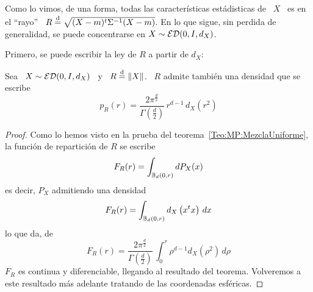Como lo vimos, de una forma, todas las caracter\'isticas est\'adisticas de \ $X$
\ es  en el ``rayo''  \ $R \stackrel{\mathrm{d}}{=}  \sqrt{(X-m)^t \Sigma^{-1} (X-m)}$. En  lo que
sigue,  sin   perdida  de  generalidad,   se  puede  concentrarse  en   $X  \sim
\mathcal{ED}(0,I,d_X)$.

Primero, se puede escribir la ley de $R$ a partir de $d_X$:
%
\begin{teorema}\label{Teo:MP:DensidadRayo}
  Sea \ $X \sim \mathcal{ED}(0,I,d_X)$ \ y \ $R \stackrel{\mathrm{d}}{=} \|X\|$. \ $R$ admite tambi\'en una
  densidad que se escribe
  \[
  p_R(r)  =  \frac{2  \pi^{\frac{d}{2}}}{\Gamma\left(  \frac{d}{2}  \right)}  \,
  r^{d-1} \, d_X\left( r^2 \right)
  \]
\end{teorema}
%
\begin{proof}
  Como lo  hemos visto en la prueba  del teorema~\ref{Teo:MP:MezclaUniforme}, la
  funci\'on de repartici\'on de $R$ se escribe
  \[
  F_R(r) = \int_{\mathbb{B}_d(0,r)} dP_X(x)
  \]
  es decir, $P_X$ admitiendo una densidad
  \[
  F_R(r) = \int_{\mathbb{B}_d(0,r)} d_X\left( x^t x \right) \, dx
  \]
  lo que da, de~\cite[Ec.~4.642]{GraRyz15}
  \[
  F_R(r)  =  \frac{2  \pi^{\frac{d}{2}}}{\Gamma\left(  \frac{d}{2}  \right)}  \,
  \int_0^r \rho^{d-1} d_X\left( \rho^2 \right) \, d\rho
  \]
  $F_R$   es    continua   y   diferenciable,   llegando    al   resultado   del
  teorema.  Volveremos   a  este  resultado  m\'as  adelante   tratando  de  las
  coordenadas esf\'ericas.
\end{proof}

